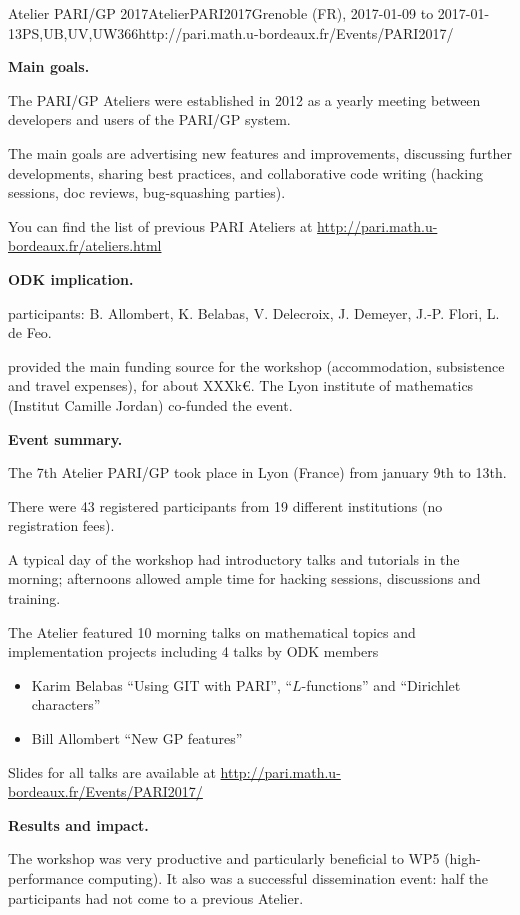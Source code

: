 \begin{event}{Atelier PARI/GP 2017}{AtelierPARI2017}{Grenoble (FR),
2017-01-09 to 2017-01-13}{PS,UB,UV,UW}{36}{6}{http://pari.math.u-bordeaux.fr/Events/PARI2017/}

\textbf{Main goals.}

The PARI/GP Ateliers were established in 2012 as a yearly meeting
between developers and users of the PARI/GP system.

The main goals are advertising new features and improvements,
discussing further developments, sharing best practices, and collaborative
code writing (hacking sessions, doc reviews, bug-squashing parties).

You can find the list of previous PARI Ateliers at
\url{http://pari.math.u-bordeaux.fr/ateliers.html}

\textbf{ODK implication.} 

\ODK participants: B. Allombert, K. Belabas, V. Delecroix, J. Demeyer,
J.-P. Flori, L. de Feo.

\ODK provided the main funding source for the workshop (accommodation,
subsistence and travel expenses), for about XXXk\euro. The Lyon
institute of mathematics (Institut Camille Jordan) co-funded the event.

\textbf{Event summary.} 

The 7th Atelier PARI/GP took place in Lyon (France) from january
9th to 13th.

There were 43 registered participants from 19 different institutions
(no registration fees).

A typical day of the workshop had introductory talks and tutorials
in the morning; afternoons allowed ample time for hacking sessions,
discussions and training.

The Atelier featured 10 morning talks on mathematical topics and
implementation projects including 4 talks by ODK members
\begin{itemize}
\item Karim Belabas ``Using GIT with PARI'', ``$L$-functions'' and
  ``Dirichlet characters''
\item Bill Allombert ``New GP features''
\end{itemize}

Slides for all talks are available at
\url{http://pari.math.u-bordeaux.fr/Events/PARI2017/}

\textbf{Results and impact.} 

The workshop was very productive and particularly beneficial to WP5
(high-performance computing). It also was a successful dissemination event: half
  the participants had not come to a previous Atelier.

\end{event}
